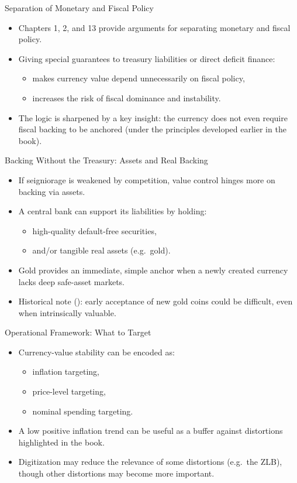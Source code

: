 \documentclass[11pt,aspectratio=169]{beamer}
\begin{document}
\begin{frame}{Separation of Monetary and Fiscal Policy}
\small
\begin{itemize}
  \item Chapters 1, 2, and 13 provide arguments for separating monetary and fiscal policy.
  \item Giving special guarantees to treasury liabilities or direct deficit finance:
  \begin{itemize}
    \item makes currency value depend unnecessarily on fiscal policy,
    \item increases the risk of fiscal dominance and instability.
  \end{itemize}
  \item The logic is sharpened by a key insight: the currency does not even require fiscal backing to be anchored (under the principles developed earlier in the book).
\end{itemize}
\end{frame}

\begin{frame}{Backing Without the Treasury: Assets and Real Backing}
\small
\begin{itemize}
  \item If seigniorage is weakened by competition, value control hinges more on backing via assets.
  \item A central bank can support its liabilities by holding:
  \begin{itemize}
    \item high-quality default-free securities,
    \item and/or tangible real assets (e.g.\ gold).
  \end{itemize}
  \item Gold provides an immediate, simple anchor when a newly created currency lacks deep safe-asset markets.
  \item Historical note (\cite{cipolla1956}): early acceptance of new gold coins could be difficult, even when intrinsically valuable.
\end{itemize}
\end{frame}

\begin{frame}{Operational Framework: What to Target}
\small
\begin{itemize}
  \item Currency-value stability can be encoded as:
  \begin{itemize}
    \item inflation targeting,
    \item price-level targeting,
    \item nominal spending targeting.
  \end{itemize}
  \item A low positive inflation trend can be useful as a buffer against distortions highlighted in the book.
  \item Digitization may reduce the relevance of some distortions (e.g.\ the ZLB), though other distortions may become more important.
\end{itemize}
\end{frame}
\end{document}
